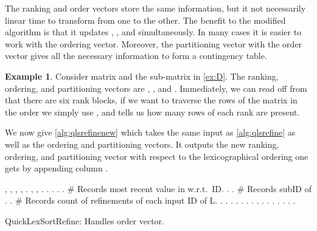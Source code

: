 \documentclass[a4paper,10pt,reqno]{amsart}
\theoremstyle{definition}
\newtheorem{example}{Example}
\begin{document}
The ranking and order vectors store the same information, but it not
necessarily linear time to transform from one to the other. The benefit to the
modified algorithm is that it updates , , and  simultaneously. In many
cases it is easier to work with the ordering vector. Moreover, the partitioning
vector with the order vector gives all the necessary information to form a
contingency table.

\begin{example}
Consider matrix  and the sub-matrix  in \autoref{ex:D}. The ranking,
ordering, and partitioning vectors are ,
, and . Immediately, we can read off
from  that there are six rank blocks, if we want to traverse the rows
of the matrix  in the order we simply use , and  tells us how many rows
of each rank are present.
\end{example}


We now give \autoref{alg:qlsrefinenew} which takes the same input as
\autoref{alg:qlsrefine} as well as the ordering and partitioning vectors. It
outputs the new ranking, ordering, and partitioning vector with respect to the
lexicographical ordering one gets by appending column .


\begin{algorithm}[!h]
\begin{algorithmic}[1]
    \REQUIRE , , , , .
    \ENSURE , , .
    \STATE . 
    \STATE . 
    \STATE . 
    \STATE . \# Records most recent value in  w.r.t.\ ID.
    \STATE .
    \STATE . \# Records subID of .
    \STATE . \# Records count of refinements of each input ID of L.
    \FOR{  }
        \STATE .
        \STATE .
        \IF{ } \STATE .
            \STATE .
        \ELSE
            \IF{ }
                \STATE .
                \STATE .
            \ENDIF
        \ENDIF
        \STATE .
    \ENDFOR
    \STATE .
    \STATE .
    \FOR{  }
        \STATE .
    \ENDFOR
    \STATE .
    \FOR{ }
        \STATE .
        \IF{ }
            \STATE .
            \STATE .
        \ENDIF
    \ENDFOR
    \RETURN .
\end{algorithmic}
\caption{QuickLexSortRefine\dag: Handles order vector.}
\label{alg:qlsrefinenew}
\end{algorithm}
\end{document}
